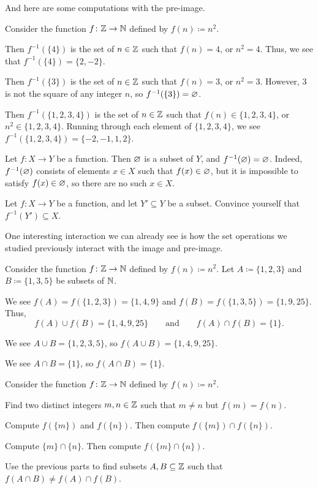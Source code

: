 \documentclass[../notes.tex]{subfiles}
\begin{document}
And here are some computations with the pre-image.
\begin{example}
    Consider the function $f\colon\mathbb Z\to\mathbb N$ defined by $f(n)\coloneqq n^2$.
    \begin{listalph}
        \item Then $f^{-1}(\{4\})$ is the set of $n\in\mathbb Z$ such that $f(n)=4$, or $n^2=4$. Thus, we see that $f^{-1}(\{4\})=\{2,-2\}$.
        \item Then $f^{-1}(\{3\})$ is the set of $n\in\mathbb Z$ such that $f(n)=3$, or $n^2=3$. However, $3$ is not the square of any integer $n$, so $f^{-1}(\{3\})=\varnothing$.
        \item Then $f^{-1}(\{1,2,3,4\})$ is the set of $n\in\mathbb Z$ such that $f(n)\in\{1,2,3,4\}$, or $n^2\in\{1,2,3,4\}$. Running through each element of $\{1,2,3,4\}$, we see $f^{-1}(\{1,2,3,4\})=\{-2,-1,1,2\}$.
    \end{listalph}
\end{example}
\begin{example}
    Let $f\colon X\to Y$ be a function. Then $\varnothing$ is a subset of $Y$, and $f^{-1}(\varnothing)=\varnothing$. Indeed, $f^{-1}(\varnothing)$ consists of elements $x\in X$ such that $f(x)\in\varnothing$, but it is impossible to satisfy $f(x)\in\varnothing$, so there are no such $x\in X$.
\end{example}
\begin{exercise}
    Let $f\colon X\to Y$ be a function, and let $Y'\subseteq Y$ be a subset. Convince yourself that $f^{-1}(Y')\subseteq X$.
\end{exercise}
One interesting interaction we can already see is how the set operations we studied previously interact with the image and pre-image.
\begin{example}
    Consider the function $f\colon\mathbb Z\to\mathbb N$ defined by $f(n)\coloneqq n^2$. Let $A\coloneqq\{1,2,3\}$ and $B\coloneqq\{1,3,5\}$ be subsets of $\mathbb N$.
    \begin{listalph}
        \item We see $f(A)=f(\{1,2,3\})=\{1,4,9\}$ and $f(B)=f(\{1,3,5\})=\{1,9,25\}$. Thus,
        \[f(A)\cup f(B)=\{1,4,9,25\}\qquad\text{and}\qquad f(A)\cap f(B)=\{1\}.\]
        \item We see $A\cup B=\{1,2,3,5\}$, so $f(A\cup B)=\{1,4,9,25\}$.
        \item We see $A\cap B=\{1\}$, so $f(A\cap B)=\{1\}$.
    \end{listalph}
\end{example}
\begin{exercise}
    Consider the function $f\colon\mathbb Z\to\mathbb N$ defined by $f(n)\coloneqq n^2$.
    \begin{listalph}
        \item Find two distinct integers $m,n\in\mathbb Z$ such that $m\ne n$ but $f(m)=f(n)$.
        \item Compute $f(\{m\})$ and $f(\{n\})$. Then compute $f(\{m\})\cap f(\{n\})$.
        \item Compute $\{m\}\cap\{n\}$. Then compute $f(\{m\}\cap\{n\})$.
        \item Use the previous parts to find subsets $A,B\subseteq\mathbb Z$ such that $f(A\cap B)\ne f(A)\cap f(B)$.
    \end{listalph}
\end{exercise}
\end{document}
